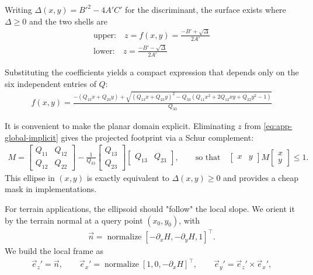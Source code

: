 Writing $\Delta(x,y)=B'^2-4A'C'$ for the discriminant, the surface exists where $\Delta\ge 0$ and the two shells are
\begin{align}
    \label{eq:app-upper}
    \text{upper:}\quad z = f(x,y) = \frac{-B' + \sqrt{ \Delta }}{ 2A' } \\
    \label{eq:app-lower}
    \text{lower:}\quad z = \frac{-B' - \sqrt{\Delta}}{2A'}
\end{align}

Substituting the coefficients yields a compact expression that depends only on the six independent entries of $Q$:
\begin{align}
    \label{eq:app-upper-final}
    f(x,y)=
    \frac{
    -(Q_{13}x+Q_{23}y)
    +\sqrt{(Q_{13}x+Q_{23}y)^2 - Q_{33} \left(Q_{11}x^2 + 2Q_{12}xy + Q_{22}y^2 - 1\right)}
    }{Q_{33}}
\end{align}


It is convenient to make the planar domain explicit. Eliminating $z$ from \cref{eq:app-global-implicit} gives the projected footprint via a Schur complement:
\begin{align}
    M =
    \begin{bmatrix}
    Q_{11} & Q_{12}\\
    Q_{12} & Q_{22}
    \end{bmatrix}
    -
    \frac{1}{Q_{33}}
    \begin{bmatrix}
    Q_{13}\\ Q_{23}
    \end{bmatrix}
    \begin{bmatrix}
    Q_{13} & Q_{23}
    \end{bmatrix},
    \qquad
    \text{so that}\quad
    \begin{bmatrix}x & y\end{bmatrix} M \begin{bmatrix}x\\ y\end{bmatrix} \le 1.
\end{align}
This ellipse in $(x,y)$ is exactly equivalent to $\Delta(x,y)\ge 0$ and provides a cheap mask in implementations.

For terrain applications, the ellipsoid should "follow" the local slope. We orient it by the terrain normal at a query point $(x_0,y_0)$, with
\begin{align}
    \label{eq:app-terrain-normal}
    \vec n=\operatorname{normalize} [-\partial_x H, -\partial_y H, 1]^\top .
\end{align}
We build the local frame as
\begin{align}
    \vec e_z'=\vec n,
    \qquad
    \vec e_x'=\operatorname{normalize} [1,0,-\partial_x H]^\top ,
    \qquad
    \vec e_y'=\vec e_z'\times \vec e_x',
\end{align}

